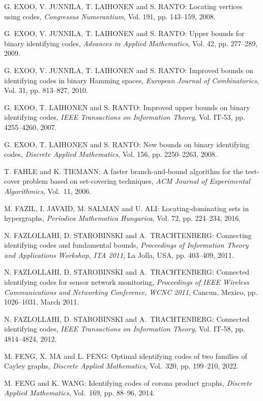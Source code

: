 \begin{thebibliography}{999}
G. EXOO, V. JUNNILA, T. LAIHONEN and S. RANTO: Locating vertices using codes, {\it Congressus Numerantium}, Vol. 191, pp. 143--159, 2008.

G. EXOO, V. JUNNILA, T. LAIHONEN and S. RANTO: Upper bounds for binary identifying codes, {\it Advances in Applied Mathematics}, Vol. 42, pp. 277--289, 2009.

G. EXOO, V. JUNNILA, T. LAIHONEN and S. RANTO: Improved bounds on identifying codes in binary Hamming spaces, {\it European Journal of Combinatorics}, Vol. 31, pp. 813--827, 2010.

G. EXOO, T. LAIHONEN and S. RANTO: Improved upper bounds on binary identifying codes, {\it IEEE Transactions on Information Theory}, Vol. IT-53, pp. 4255--4260, 2007.

G. EXOO, T. LAIHONEN and S. RANTO: New bounds on binary identifying codes, {\it Discrete Applied Mathematics}, Vol. 156, pp. 2250--2263, 2008.

T. FAHLE and K. TIEMANN: A faster branch-and-bound algorithm for the test-cover problem based on set-covering techniques, {\it ACM Journal of Experimental Algorithmics}, Vol.~11, 2006.

M. FAZIL, I. JAVAID, M. SALMAN and U. ALI: Locating-dominating sets in hypergraphs, {\it Periodica Mathematica Hungarica}, Vol. 72,  pp. 224--234, 2016.

N. FAZLOLLAHI, D. STAROBINSKI and A.~TRACHTENBERG: Connecting identifying codes and fundamental bounds, {\it Proceedings of Information Theory and Applications Workshop, ITA 2011}, La Jolla, USA, pp. 403--409, 2011.

N. FAZLOLLAHI, D. STAROBINSKI and A.~TRACHTENBERG: Connected identifying codes for sensor network monitoring, {\it Proceedings of IEEE Wireless Communications and Networking Conference, WCNC 2011}, Cancun, Mexico, pp. 1026--1031, March 2011.

N. FAZLOLLAHI, D. STAROBINSKI and A.~TRACHTENBERG: Connected identifying codes, {\it IEEE Transactions on Information Theory}, Vol. IT-58, pp. 4814--4824, 2012.

M. FENG, X. MA and L. FENG: Optimal identifying codes of two families of Cayley graphs, {\it Discrete Applied Mathematics}, Vol.~320, pp. 199--210, 2022.

M. FENG and K. WANG: Identifying codes of corona product graphs, {\it Discrete Applied Mathematics}, Vol.~169, pp. 88--96, 2014.


\end{thebibliography}
